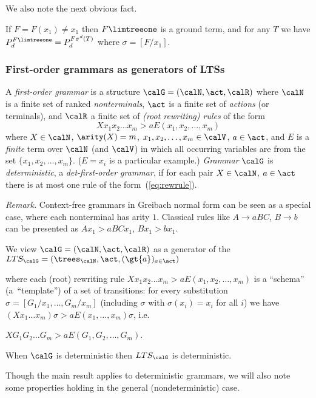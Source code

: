 \documentclass[12pt]{article}
\begin{document}
We also note the next obvious fact.

\begin{observ}\label{prop:limdprefform}
If $F=F(x_1)\neq x_1$ then $F\limtreeone$ is a ground term, and for
any $T$ we
have $P^{F\limtreeone}_d=P^{F\sigma^d(T)}_d$ where 
$\sigma=[F/x_1]$.
\end{observ}








\subsubsection*{First-order grammars as generators
of LTSs}

\begin{defn}
A \emph{first-order grammar} is a structure 
$\calG=(\calN,\act,\calR)$ where $\calN$ is a finite set of 
ranked \emph{nonterminals}, 
$\act$ is a finite set of \emph{actions} (or terminals), 
and $\calR$ 
a finite set of \emph{(root rewriting) rules} of the form
\begin{equation}\label{eq:rewrule}
Xx_1x_2\dots x_m\gt{a} E(x_1,x_2,\dots,x_m)
\end{equation}
where $X\in \calN$, $\arity(X)=m$, 
$x_1,x_2,\dots,x_m\in \calV$,
$a\in\act$,
and $E$ is a
\emph{finite}  term over $\calN$ (and $\calV$) 
 in which all occurring
variables are from the set
$\{x_1,x_2,\dots,x_m\}$.
($E=x_i$ is a particular example.)
\emph{Grammar} $\calG$ is \emph{deterministic}, a \emph{det-first-order
grammar},
if for each pair $X\in\calN$, $a\in\act$ 
there is at most one rule of the form~(\ref{eq:rewrule}). 
\end{defn}

\smallskip

\noindent
\emph{Remark.}
Context-free grammars  in Greibach normal form
can be seen as  a special case,
where each nonterminal has arity $1$.
Classical rules like $A\rightarrow
aBC$, $B\rightarrow b$ can be presented as 
$Ax_1\gt{a}BCx_1$,
$Bx_1\gt{b}x_1$.

\begin{center}
We view $\calG=(\calN,\act,\calR)$
as a generator of the 
$LTS_{\calG}=(\trees_{\calN},\act,(\gt{a})_{a\in\act})$
\end{center}
where each (root) rewriting rule
$Xx_1x_2\dots x_m\gt{a} E(x_1,x_2,\dots,x_m)$
is a ``schema''
(a~``template'') of a set of transitions:
for every substitution $\sigma=[G_1/x_1,\dots,G_m/x_m]$
(including $\sigma$ with $\sigma(x_i)=x_i$ for all $i$)
we have 
$(Xx_1\dots x_m)\sigma\gt{a}E(x_1,\dots,x_m)\sigma$, 
i.e.
\begin{center}
$XG_{1} G_{2} \ldots G_{m} \gt{a} E(G_1,G_2,\dots,G_m)$.
\end{center}
\begin{observ}
When $\calG$ is deterministic then  $LTS_{\calG}$ is deterministic.
\end{observ}
Though the main result applies to deterministic grammars, we will also 
note some properties holding in the general (nondeterministic) case.
\end{document}
